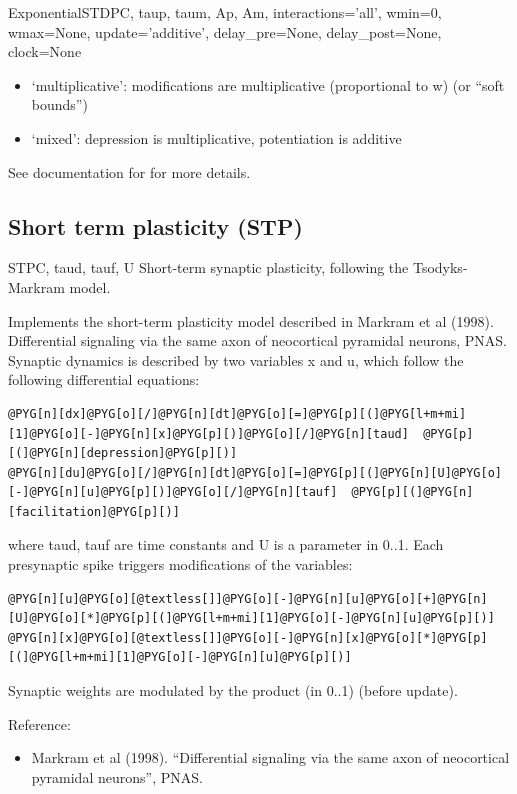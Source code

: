 \documentclass[letterpaper,10pt,english]{manual}
\begin{document}
\begin{classdesc}{ExponentialSTDP}{C, taup, taum, Ap, Am, interactions='all', wmin=0, wmax=None, update='additive', delay\_pre=None, delay\_post=None, clock=None}
\begin{description}
\begin{itemize}
\item {} 
`multiplicative': modifications are multiplicative (proportional to w)
(or ``soft bounds'')

\item {} 
`mixed': depression is multiplicative, potentiation is additive

\end{itemize}

\end{description}

See documentation for \hyperlink{brian.STDP}{} for more details.
\end{classdesc}


\subsection{Short term plasticity (STP)}

\hypertarget{brian.STP}{}\begin{classdesc}{STP}{C, taud, tauf, U}
Short-term synaptic plasticity, following the Tsodyks-Markram model.

Implements the short-term plasticity model described in Markram et al (1998).
Differential signaling via the same axon of
neocortical pyramidal neurons, PNAS.
Synaptic dynamics is described by two variables x and u, which follow
the following differential equations:

\begin{Verbatim}[commandchars=@\[\]]
@PYG[n][dx]@PYG[o][/]@PYG[n][dt]@PYG[o][=]@PYG[p][(]@PYG[l+m+mi][1]@PYG[o][-]@PYG[n][x]@PYG[p][)]@PYG[o][/]@PYG[n][taud]  @PYG[p][(]@PYG[n][depression]@PYG[p][)]
@PYG[n][du]@PYG[o][/]@PYG[n][dt]@PYG[o][=]@PYG[p][(]@PYG[n][U]@PYG[o][-]@PYG[n][u]@PYG[p][)]@PYG[o][/]@PYG[n][tauf]  @PYG[p][(]@PYG[n][facilitation]@PYG[p][)]
\end{Verbatim}

where taud, tauf are time constants and U is a parameter in 0..1. Each presynaptic
spike triggers modifications of the variables:

\begin{Verbatim}[commandchars=@\[\]]
@PYG[n][u]@PYG[o][@textless[]]@PYG[o][-]@PYG[n][u]@PYG[o][+]@PYG[n][U]@PYG[o][*]@PYG[p][(]@PYG[l+m+mi][1]@PYG[o][-]@PYG[n][u]@PYG[p][)]
@PYG[n][x]@PYG[o][@textless[]]@PYG[o][-]@PYG[n][x]@PYG[o][*]@PYG[p][(]@PYG[l+m+mi][1]@PYG[o][-]@PYG[n][u]@PYG[p][)]
\end{Verbatim}

Synaptic weights are modulated by the product  (in 0..1) (before update).

Reference:
\begin{itemize}
\item {} 
Markram et al (1998). ``Differential signaling via the same axon of
neocortical pyramidal neurons'', PNAS.

\end{itemize}
\end{classdesc}
\end{document}
